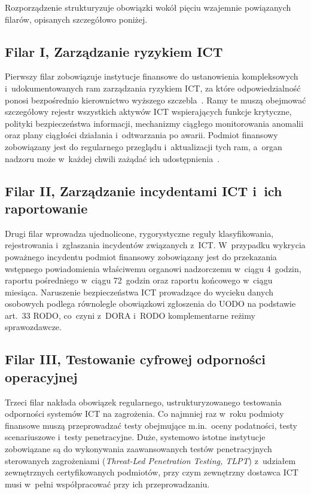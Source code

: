 Rozporządzenie strukturyzuje obowiązki wokół pięciu wzajemnie powiązanych filarów, opisanych szczegółowo poniżej.

\subsection*{Filar I, Zarządzanie ryzykiem ICT}

Pierwszy filar zobowiązuje instytucje finansowe do ustanowienia kompleksowych i~udokumentowanych ram zarządzania ryzykiem ICT, za które odpowiedzialność ponosi
bezpośrednio kierownictwo wyższego szczebla~\autocite{dora2022}. Ramy te muszą obejmować szczegółowy rejestr wszystkich aktywów ICT wspierających funkcje krytyczne, polityki bezpieczeństwa informacji, mechanizmy ciągłego monitorowania anomalii oraz plany ciągłości działania i~odtwarzania po awarii. Podmiot finansowy zobowiązany jest do regularnego przeglądu i~aktualizacji tych ram, a~organ nadzoru może w~każdej chwili
zażądać ich udostępnienia~\autocite{resilia_dora}.

\subsection*{Filar II, Zarządzanie incydentami ICT i~ich raportowanie}

Drugi filar wprowadza ujednolicone, rygorystyczne reguły klasyfikowania, rejestrowania i~zgłaszania incydentów związanych z~ICT. W~przypadku wykrycia
poważnego incydentu podmiot finansowy zobowiązany jest do przekazania wstępnego powiadomienia właściwemu organowi nadzorczemu w~ciągu 4~godzin,
raportu pośredniego w~ciągu 72~godzin oraz raportu końcowego w~ciągu miesiąca.
Naruszenie bezpieczeństwa ICT prowadzące do wycieku danych osobowych podlega równolegle obowiązkowi zgłoszenia do UODO na podstawie art.~33 RODO, co~czyni z~DORA i~RODO komplementarne reżimy sprawozdawcze.

\subsection*{Filar III, Testowanie cyfrowej odporności operacyjnej}

Trzeci filar nakłada obowiązek regularnego, ustrukturyzowanego testowania odporności systemów ICT na zagrożenia. Co najmniej raz w~roku podmioty finansowe
muszą przeprowadzać testy obejmujące m.in.\ oceny podatności, testy scenariuszowe i~testy penetracyjne. Duże, systemowo istotne instytucje zobowiązane są do wykonywania zaawansowanych testów penetracyjnych sterowanych zagrożeniami (\textit{Threat-Led Penetration Testing, TLPT}) z~udziałem zewnętrznych certyfikowanych podmiotów, przy czym zewnętrzny dostawca ICT musi w~pełni współpracować przy ich przeprowadzaniu.

